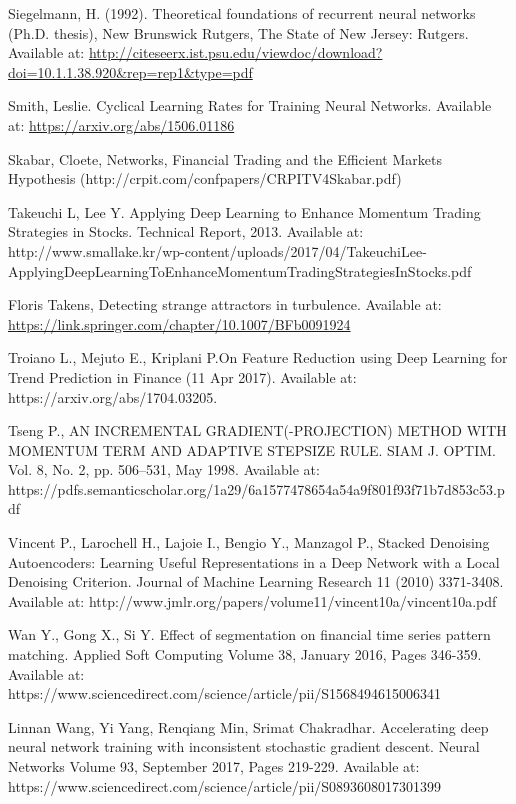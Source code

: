 \documentclass[a4paper,11pt,oneside]{article}
\theoremstyle{plain}
\theoremstyle{definition}
\begin{document}
\begin{thebibliography}{bibliography}
Siegelmann, H. (1992). Theoretical foundations of recurrent neural networks (Ph.D. thesis), New Brunswick Rutgers, The State of New Jersey: Rutgers. Available at: \url{http://citeseerx.ist.psu.edu/viewdoc/download?doi=10.1.1.38.920&rep=rep1&type=pdf}


Smith, Leslie. Cyclical Learning Rates for Training Neural Networks. Available at: \url{https://arxiv.org/abs/1506.01186}

 Skabar, Cloete, Networks, Financial Trading and the Efficient Markets Hypothesis (http://crpit.com/confpapers/CRPITV4Skabar.pdf)

Takeuchi L, Lee Y. Applying Deep Learning to Enhance Momentum Trading Strategies in 
Stocks. Technical Report, 2013. Available at: http://www.smallake.kr/wp-content/uploads/2017/04/TakeuchiLee-ApplyingDeepLearningToEnhanceMomentumTradingStrategiesInStocks.pdf

Floris Takens, Detecting strange attractors in turbulence. Available at: \url{https://link.springer.com/chapter/10.1007/BFb0091924}

Troiano L., Mejuto E., Kriplani P.On Feature Reduction using Deep Learning
for Trend Prediction in Finance (11 Apr 2017).  Available at: 
https://arxiv.org/abs/1704.03205.

Tseng P., AN INCREMENTAL GRADIENT(-PROJECTION) METHOD
WITH MOMENTUM TERM AND ADAPTIVE STEPSIZE RULE. SIAM J. OPTIM.  Vol. 8, No. 2, pp. 506–531, May 
1998. Available at: https://pdfs.semanticscholar.org/1a29/6a1577478654a54a9f801f93f71b7d853c53.pdf

Vincent P., Larochell H., Lajoie I., Bengio Y., Manzagol P., Stacked Denoising Autoencoders: Learning Useful Representations in
a Deep Network with a Local Denoising Criterion. Journal of Machine Learning Research 11 (2010) 
3371-3408. Available at: http://www.jmlr.org/papers/volume11/vincent10a/vincent10a.pdf

Wan Y., Gong X., Si Y. Effect of segmentation on financial time series pattern 
matching. Applied Soft Computing Volume 38, January 2016, Pages 346-359. 
Available at: https://www.sciencedirect.com/science/article/pii/S1568494615006341

Linnan Wang,  Yi Yang, Renqiang Min, Srimat Chakradhar. Accelerating deep neural network training with 
inconsistent stochastic gradient descent. Neural Networks
Volume 93, September 2017, Pages 219-229. Available at: https://www.sciencedirect.com/science/article/pii/S0893608017301399


\end{thebibliography}
\end{document}
